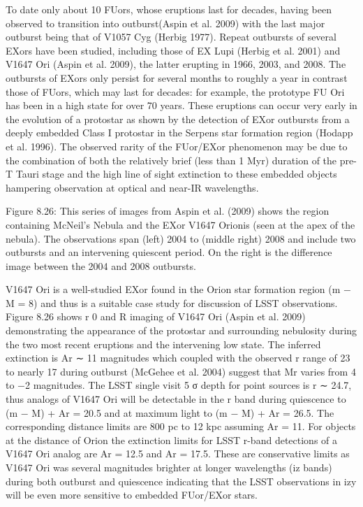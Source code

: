 To date only about 10 FUors, whose eruptions last for decades, having been observed to transition
into outburst(Aspin et al. 2009) with the last major outburst being that of V1057 Cyg (Herbig
1977). Repeat outbursts of several EXors have been studied, including those of EX Lupi (Herbig
et al. 2001) and V1647 Ori (Aspin et al. 2009), the latter erupting in 1966, 2003, and 2008. The
outbursts of EXors only persist for several months to roughly a year in contrast those of FUors,
which may last for decades: for example, the prototype FU Ori has been in a high state for over
70 years. These eruptions can occur very early in the evolution of a protostar as shown by the
detection of EXor outbursts from a deeply embedded Class I protostar in the Serpens star formation
region (Hodapp et al. 1996). The observed rarity of the FUor/EXor phenomenon may be due to
the combination of both the relatively brief (less than 1 Myr) duration of the pre-T Tauri stage
and the high line of sight extinction to these embedded objects hampering observation at optical
and near-IR wavelengths.

Figure 8.26: This series of images from Aspin et al. (2009) shows the region containing McNeil’s Nebula and the
EXor V1647 Orionis (seen at the apex of the nebula). The observations span (left) 2004 to (middle right) 2008 and
include two outbursts and an intervening quiescent period. On the right is the difference image between the 2004
and 2008 outbursts.

V1647 Ori is a well-studied EXor found in the Orion star formation region (m − M = 8) and
thus is a suitable case study for discussion of LSST observations. Figure 8.26 shows r
0 and R
imaging of V1647 Ori (Aspin et al. 2009) demonstrating the appearance of the protostar and
surrounding nebulosity during the two most recent eruptions and the intervening low state. The
inferred extinction is Ar ∼ 11 magnitudes which coupled with the observed r range of 23 to nearly
17 during outburst (McGehee et al. 2004) suggest that Mr varies from 4 to −2 magnitudes.
The LSST single visit 5 σ depth for point sources is r ∼ 24.7, thus analogs of V1647 Ori will
be detectable in the r band during quiescence to (m − M) + Ar = 20.5 and at maximum light
to (m − M) + Ar = 26.5. The corresponding distance limits are 800 pc to 12 kpc assuming
Ar = 11. For objects at the distance of Orion the extinction limits for LSST r-band detections of
a V1647 Ori analog are Ar = 12.5 and Ar = 17.5. These are conservative limits as V1647 Ori was
several magnitudes brighter at longer wavelengths (iz bands) during both outburst and quiescence
indicating that the LSST observations in izy will be even more sensitive to embedded FUor/EXor
stars.

